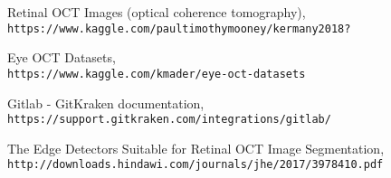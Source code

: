 \documentclass[12pt,a4paper]{article}
\begin{document}
\newpage
\begin{thebibliography}{9}

Retinal OCT Images (optical coherence tomography),
\\\texttt{https://www.kaggle.com/paultimothymooney/kermany2018?}

Eye OCT Datasets,
\\\texttt{https://www.kaggle.com/kmader/eye-oct-datasets}

Gitlab - GitKraken documentation,
\\\texttt{https://support.gitkraken.com/integrations/gitlab/}

The Edge Detectors Suitable for Retinal OCT Image Segmentation,
\\\texttt{http://downloads.hindawi.com/journals/jhe/2017/3978410.pdf}

\end{thebibliography}
\end{document}
